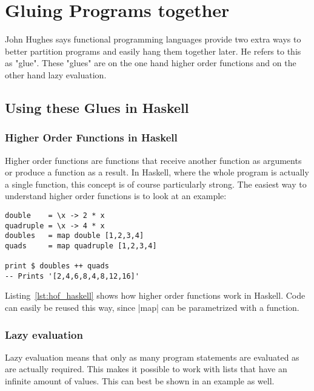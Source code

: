 \section{Gluing Programs together}
John Hughes says functional programming languages provide two extra ways to
better partition programs and easily hang them together later. He refers to
this as "glue". These "glues" are on the one hand higher order functions and on
the other hand lazy evaluation. \cite{hughes_why_1989}

\subsection{Using these Glues in Haskell} %
\label{sub:Using these Glues in Haskel}

\subsubsection{Higher Order Functions in Haskell} %
\label{sec:Higher order functions Haskell}
Higher order functions are functions that receive another function as arguments
or produce a function as a result. In Haskell, where the whole program is
actually a single function, this concept is of course particularly strong.
The easiest way to understand higher order functions is to look at an
example:

\begin{lstlisting}[style=Haskell, caption=Higher order functions in
Haskell \label{lst:hof_haskell}]
double    = \x -> 2 * x
quadruple = \x -> 4 * x
doubles   = map double [1,2,3,4]
quads     = map quadruple [1,2,3,4]

print $ doubles ++ quads
-- Prints '[2,4,6,8,4,8,12,16]'
\end{lstlisting}

Listing~\ref{lst:hof_haskell} shows how higher order functions work in Haskell.
Code can easily be reused this way, since |map| can be parametrized with a
function.

\subsubsection{Lazy evaluation} %
\label{subsub:Evaluation}
Lazy evaluation means that only as many program statements are evaluated as are
actually required. This makes it possible to work with lists that have an
infinite amount of values. This can best be shown in an example as well.

